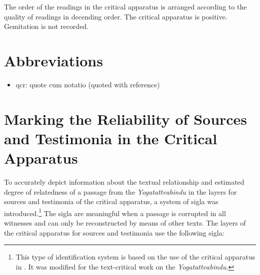 The order of the readings in the critical apparatus is arranged according to the quality of readings in decending order. The critical apparatus is positive. Gemitation is not recorded. 

\section{Abbreviations}
\begin{itemize}
  \item qcr: quote cum notatio (quoted with reference)
  \end{itemize}

\section{Marking the Reliability of Sources and Testimonia in the Critical Apparatus}
\label{kennz}

To accurately depict information about the textual relationship and estimated degree of relatedness of a passage from the \textit{Yogatattvabindu} in the layers for sources and testimonia of the critical apparatus, a system of sigla was introduced.\footnote{This type of identification system is based on the use of the critical apparatus in \parencite[lii-liii]{steinkellner2005}. It was modified for the text-critical work on the \textit{Yogatattvabindu}.} The sigla are meaningful when a passage is corrupted in all witnesses and can only be reconstructed by means of other texts. The layers of the critical apparatus for sources and testimonia use the following sigla:

